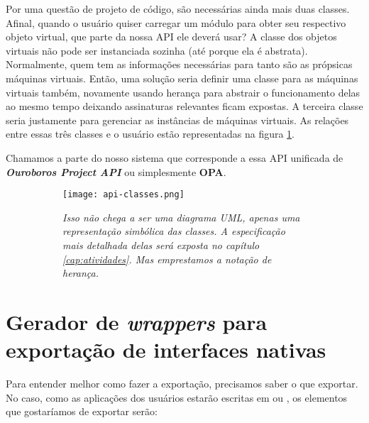     Por uma questão de projeto de código, são necessárias ainda mais duas
    classes. Afinal, quando o usuário quiser carregar um módulo para obter seu
    respectivo objeto virtual, que parte da nossa API ele deverá usar? A classe
    dos objetos virtuais não pode ser instanciada sozinha (até porque ela é
    abstrata). Normalmente, quem tem as informações necessárias para tanto são
    as própsicas máquinas virtuais. Então, uma solução seria definir uma classe
    para as máquinas virtuais também, novamente usando herança para abstrair o
    funcionamento delas ao mesmo tempo deixando assinaturas relevantes ficam
    expostas. A terceira classe seria justamente para gerenciar as instâncias de
    máquinas virtuais. As relações entre essas três classes e o usuário estão
    representadas na figura \ref{fig:api-classes}.

    Chamamos a parte do nosso sistema que corresponde a essa API unificada de
    \emph{\textbf{Ouroboros Project API}} ou simplesmente \textbf{OPA}.

    \begin{figure}[ht]
      \centering
      \caption{}
      \begin{subfigure}{.8\textwidth}
        \begin{center}
          \texttt{[image: api-classes.png]}
          \vspace{1em}

          \textit{
            Isso não chega a ser uma diagrama UML, apenas uma representação
            simbólica das classes. A especificação mais detalhada delas será
            exposta no capítulo \ref{cap:atividades}. Mas emprestamos a notação
            de herança.
          }
        \end{center}
      \end{subfigure}
      \label{fig:api-classes}
    \end{figure}
  
  \section{Gerador de \textit{wrappers} para exportação de interfaces nativas}
  \label{sec:estrutura:opwig}


    Para entender melhor como fazer a exportação, precisamos saber o que
    exportar. No caso, como as aplicações dos usuários estarão escritas em \C{}
    ou \CXX{}, os elementos que gostaríamos de exportar serão:

